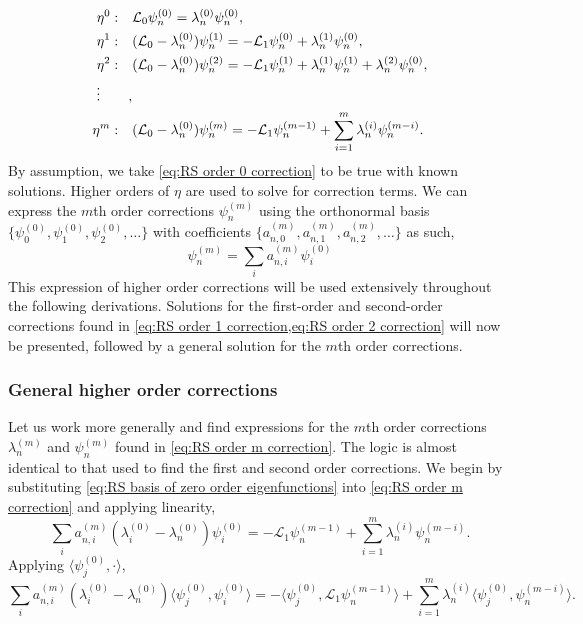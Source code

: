 \documentclass[11pt]{amsart}
\begin{document}
\begin{align}
    \eta^0: \quad & \mathcal{L}_0\psi_n^{(0)} =  \lambda_n^{(0)}\psi_n^{(0)},\label{eq:RS order 0 correction}\\
    \eta^1: \quad & (\mathcal{L}_0-\lambda_n^{(0)})\psi_n^{(1)} = -\mathcal{L}_1\psi_n^{(0)} +\lambda_n^{(1)}\psi_n^{(0)} \label{eq:RS order 1 correction}, \\
    \eta^2: \quad & (\mathcal{L}_0-\lambda_n^{(0)})\psi_n^{(2)} = -\mathcal{L}_1\psi_n^{(1)} + \lambda_n^{(1)}\psi_n^{(1)}+ \lambda_n^{(2)}\psi_n^{(0)} \label{eq:RS order 2 correction} ,\\
    \vdots \qquad \notag ,\\
    \eta^m: \quad & (\mathcal{L}_0-\lambda_n^{(0)})\psi_n^{(m)} = -\mathcal{L}_1\psi_n^{(m-1)} + \sum_{i=1}^m \lambda_n^{(i)}\psi_n^{(m-i)}. \label{eq:RS order m correction}
\end{align}
By assumption, we take \cref{eq:RS order 0 correction} to be true with known solutions. Higher orders of $\eta$ are used to solve for correction terms. We can express the $m$th order corrections $\psi_n^{(m)}$ using the orthonormal basis $\{\psi_0^{(0)}, \psi_1^{(0)}, \psi_2^{(0)}, \dots\}$ with coefficients $\{a_{n,0}^{(m)}, a_{n,1}^{(m)}, a_{n,2}^{(m)},\dots \}$ as such,
\begin{equation}
    \label{eq:RS basis of zero order eigenfunctions}
    \psi_n^{(m)} = \sum_{i} a_{n,i}^{(m)}\psi_i^{(0)}
\end{equation}
This expression of higher order corrections will be used extensively throughout the following derivations. Solutions for the first-order and second-order corrections found in \cref{eq:RS order 1 correction,eq:RS order 2 correction} will now be presented, followed by a general solution for the $m$th order corrections.

\subsubsection*{General higher order corrections}
Let us work more generally and find expressions for the $m$th order corrections $\lambda_n^{(m)}$ and $\psi_n^{(m)}$ found in \cref{eq:RS order m correction}. The logic is  almost identical to that used to find the first and second order corrections. We begin by substituting \cref{eq:RS basis of zero order eigenfunctions} into \cref{eq:RS order m correction} and applying linearity,
\begin{equation*}
    \sum_{i} a_{n,i}^{(m)}(\lambda_i^{(0)}-\lambda_n^{(0)})\psi_i^{(0)} = -\mathcal{L}_1\psi_n^{(m-1)} + \sum_{i=1}^m \lambda_n^{(i)}\psi_n^{(m-i)}.
\end{equation*}
Applying $\langle\psi_j^{(0)},\cdot\rangle$,
\begin{equation*}
    \sum_{i} a_{n,i}^{(m)}(\lambda_i^{(0)}-\lambda_n^{(0)})\langle\psi_j^{(0)},\psi_i^{(0)}\rangle = - \langle\psi_j^{(0)},\mathcal{L}_1\psi_n^{(m-1)}\rangle  + \sum_{i=1}^m \lambda_n^{(i)} \langle\psi_j^{(0)},\psi_n^{(m-i)}\rangle .
\end{equation*}
\end{document}
